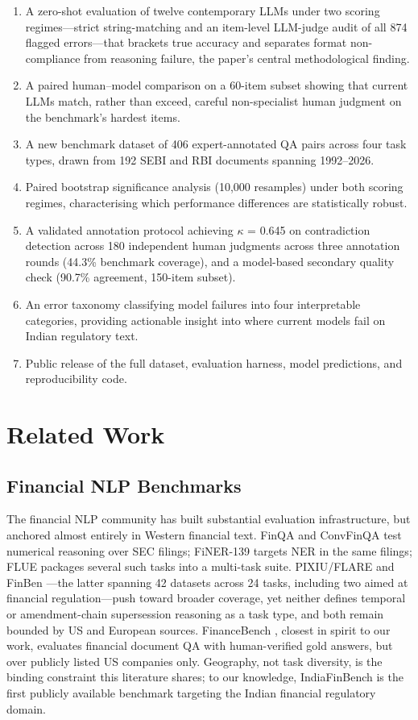 \documentclass[11pt]{article}
\begin{document}
\begin{enumerate}
\item A zero-shot evaluation of twelve contemporary LLMs under two scoring regimes---strict string-matching and an item-level LLM-judge audit of all 874 flagged errors---that brackets true accuracy and separates format non-compliance from reasoning failure, the paper's central methodological finding.
\item A paired human--model comparison on a 60-item subset showing that current LLMs match, rather than exceed, careful non-specialist human judgment on the benchmark's hardest items.
\item A new benchmark dataset of 406 expert-annotated QA pairs across four task types, drawn from 192 SEBI and RBI documents spanning 1992--2026.
\item Paired bootstrap significance analysis (10,000 resamples) under both scoring regimes, characterising which performance differences are statistically robust.
\item A validated annotation protocol achieving $\kappa$ = 0.645 on contradiction detection across 180 independent human judgments across three annotation rounds (44.3\% benchmark coverage), and a model-based secondary quality check (90.7\% agreement, 150-item subset).
\item An error taxonomy classifying model failures into four interpretable categories, providing actionable insight into where current models fail on Indian regulatory text.
\item Public release of the full dataset, evaluation harness, model predictions, and reproducibility code.
\end{enumerate}

\section{Related Work}

\subsection{Financial NLP Benchmarks}

The financial NLP community has built substantial evaluation infrastructure, but anchored almost entirely in Western financial text. FinQA \citep{chen2021finqa} and ConvFinQA \citep{zheng2022convfinqa} test numerical reasoning over SEC filings; FiNER-139 \citep{loukas2022finer} targets NER in the same filings; FLUE \citep{shah2022flue} packages several such tasks into a multi-task suite. PIXIU/FLARE \citep{xie2023pixiu} and FinBen \citep{xie2024finben}---the latter spanning 42 datasets across 24 tasks, including two aimed at financial regulation---push toward broader coverage, yet neither defines temporal or amendment-chain supersession reasoning as a task type, and both remain bounded by US and European sources. FinanceBench \citep{islam2023financebench}, closest in spirit to our work, evaluates financial document QA with human-verified gold answers, but over publicly listed US companies only. Geography, not task diversity, is the binding constraint this literature shares; to our knowledge, IndiaFinBench is the first publicly available benchmark targeting the Indian financial regulatory domain.
\end{document}
